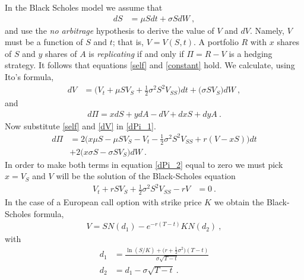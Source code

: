 \documentclass[10pt]{article}
\numberwithin{equation}{section}
\begin{document}
In the Black Scholes model we assume that
\begin{equation}\label{dS}
	\begin{split}
		dS &= \mu S dt +\sigma S dW\:,
	\end{split}
\end{equation}
and use the \emph{no arbitrage} hypothesis to derive the value of $V$ and $dV$. Namely, $V$ must be a function of $S$ and $t$; that is, $V = V(S,t)$. A portfolio $R$ with $x$ shares of $S$ and $y$ shares of $A$ is \emph{replicating} if and only if $\Pi=R-V$ is a hedging strategy. It follows that equations \eqref{self} and \eqref{constant} hold. We calculate, using Ito's formula,
\begin{equation}\label{dV}
	\begin{split}
	dV&= \biggl(V_t+\mu S V_S +\frac{1}{2} \sigma^2 S^2 V_{SS}\biggr)dt+\biggl(\sigma S V_S \biggr)dW\:,
	\end{split}
\end{equation}
and
\begin{equation}\label{dPi_1}
	\begin{split}
	d\Pi = x dS +y dA -dV + dx S+dy A\:.
	\end{split}
\end{equation}
Now substitute \eqref{self} and \eqref{dV} in \eqref{dPi_1}.
\begin{equation}\label{dPi_2}
	\begin{split}
	d\Pi &= 2 \biggl( x \mu S - \mu S V_S -V_t -\frac{1}{2} \sigma^2 S^2 V_{SS}+ r (V-xS) \biggr)dt\\
	&+ 2\biggl( x \sigma S - \sigma S V_S \biggr) dW\:.
	\end{split}
\end{equation}
In order to make both terms in equation \eqref{dPi_2} equal to zero we must pick $x = V_S$ and $V$ will be the solution of the Black-Scholes equation
\begin{equation}\label{BS}
	\begin{split}
	V_t + r S V_S + \frac{1}{2} \sigma^2 S^2 V_{SS}-rV&=0\:.
	\end{split}
\end{equation}
In the case of a European call option with strike price $K$ we obtain the Black-Scholes formula,
\begin{equation*}
	\begin{split}
	V = S N(d_1)-e^{-r(T-t)}K N(d_2)\:,
	\end{split}
\end{equation*}
with
\begin{equation*}
	\begin{split}
	d_1 &= \frac{\ln(S/K)+\bigl(r+\frac{1}{2} \sigma^2\bigr)(T-t)}{\sigma \sqrt{T-t}}\\
	d_2 &= d_1 - \sigma \sqrt{T-t}\:.
	\end{split}
\end{equation*}
\end{document}
